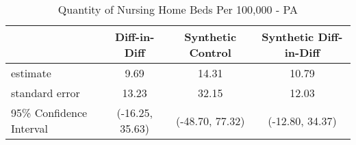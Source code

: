 \begin{table}[ht]
\centering
\begin{tabular}{lccc}
  \hline
 & Diff-in-Diff & Synthetic Control & Synthetic Diff-in-Diff \\ 
  \hline
estimate & 9.69 & 14.31 & 10.79 \\ 
  standard error & 13.23 & 32.15 & 12.03 \\ 
  95\% Confidence Interval & (-16.25, 35.63) & (-48.70, 77.32) & (-12.80, 34.37) \\ 
   \hline
\end{tabular}
\caption{Quantity of Nursing Home Beds Per 100,000 - PA} 
\end{table}
